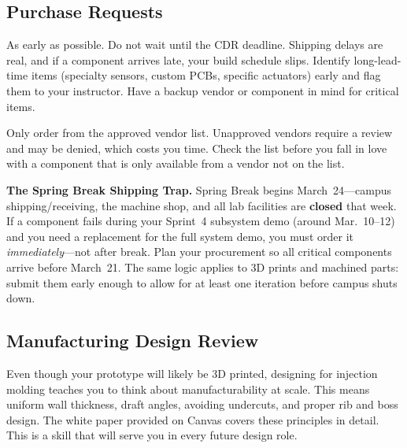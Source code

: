 \documentclass[11pt,letterpaper]{article}
\begin{document}
\subsection{Purchase Requests}

\begin{faqbox}
As early as possible. Do not wait until the CDR deadline. Shipping delays are real, and if a component arrives late, your build schedule slips. Identify long-lead-time items (specialty sensors, custom PCBs, specific actuators) early and flag them to your instructor. Have a backup vendor or component in mind for critical items.
\end{faqbox}

\begin{warnbox}
Only order from the approved vendor list. Unapproved vendors require a review and may be denied, which costs you time. Check the list before you fall in love with a component that is only available from a vendor not on the list.
\end{warnbox}

\begin{warnbox}
\textbf{The Spring Break Shipping Trap.} Spring Break begins March~24---campus shipping/receiving, the machine shop, and all lab facilities are \textbf{closed} that week. If a component fails during your Sprint~4 subsystem demo (around Mar.~10--12) and you need a replacement for the full system demo, you must order it \textit{immediately}---not after break. Plan your procurement so all critical components arrive before March~21. The same logic applies to 3D prints and machined parts: submit them early enough to allow for at least one iteration before campus shuts down.
\end{warnbox}

\subsection{Manufacturing Design Review}

\begin{faqbox}
Even though your prototype will likely be 3D printed, designing for injection molding teaches you to think about manufacturability at scale. This means uniform wall thickness, draft angles, avoiding undercuts, and proper rib and boss design. The white paper provided on Canvas covers these principles in detail. This is a skill that will serve you in every future design role.
\end{faqbox}
\end{document}
